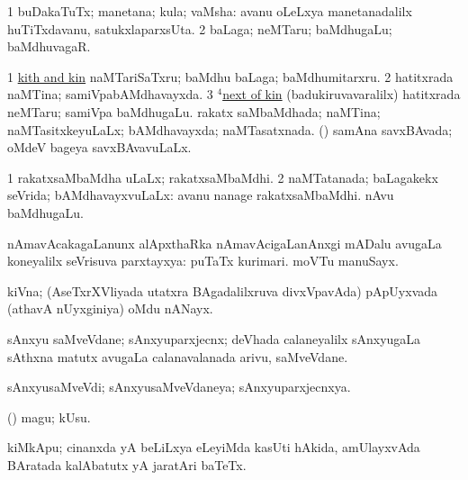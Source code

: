 \bentry
{}
\gl{\nA}
\bmng
\bnum
\num{1} buDakaTuTx; manetana; kula; vaMsha:  avanu oLeLxya manetanadalilx huTiTxdavanu, satukxlaparxsUta. 
\num{2} baLaga; neMTaru; baMdhugaLu; baMdhuvagaR. 
\enum
\emng

\noindent
\gl{\pagu}
\bmng
\bnum
\num{1} \hyperlink{kith pagu}{kith and kin} naMTariSaTxru; baMdhu baLaga; baMdhumitarxru. 
\num{2}  hatitxrada naMTina; samiVpabAMdhavayxda. 
\num{3} \hyperref{kandict_n.pdf}{N}{next(4) pagu(1)}{$^4$next of kin} (badukiruvavaralilx) hatitxrada neMTaru; samiVpa baMdhugaLu. 
  
\banum
{} rakatx saMbaMdhada; naMTina; naMTasitxkeyuLaLx; bAMdhavayxda; naMTasatxnada. 
 (\rUpa) samAna savxBAvada; oMdeV bageya savxBAvavuLaLx. 
\eanum
\numie
\enum
\emng
\eentry

\bentry
{}
\gl{\Agu}
\bmng
\bnum
\num{1} rakatxsaMbaMdha uLaLx; rakatxsaMbaMdhi. 
\num{2} naMTatanada; baLagakekx seVrida; bAMdhavayxvuLaLx:  avanu nanage rakatxsaMbaMdhi.  nAvu baMdhugaLu. 
\enum
\emng
\eentry

\bentry
{}
\gl{\uparx}
\bmng
nAmavAcakagaLanunx alApxthaRka nAmavAcigaLanAnxgi mADalu avugaLa koneyalilx seVrisuva parxtayxya:  puTaTx kurimari.  moVTu manuSayx. 
\emng
\eentry

\bentry
{}
\gl{\nA}
\bmng
kiVna; (AseTxrXVliyada utatxra BAgadalilxruva divxVpavAda) pApUyxvada (athavA nUyxginiya) oMdu nANayx. 
\emng
\eentry

\bentry
{}
\gl{\nA}
\bmng
sAnxyu saMveVdane; sAnxyuparxjecnx; deVhada calaneyalilx sAnxyugaLa sAthxna matutx avugaLa calanavalanada arivu, saMveVdane. 
\emng
\eentry

\bentry
{}
\gl{\gu}
\bmng
sAnxyusaMveVdi; sAnxyusaMveVdaneya; sAnxyuparxjecnxya. 
\emng
\eentry

\bentry
{}
\gl{\nA}
\bmng
(\ashi) magu; kUsu. 
\emng
\eentry

\bentry
{}
\gl{\nA}
\bmng
kiMkApu; cinanxda yA beLiLxya eLeyiMda kasUti hAkida, amUlayxvAda BAratada kalAbatutx yA jaratAri baTeTx. 
\emng
\eentry

